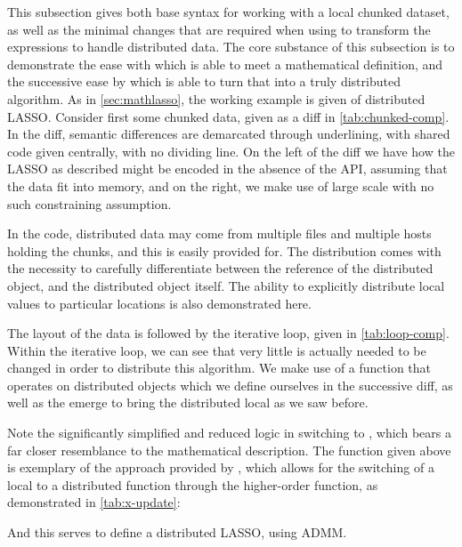 This subsection gives both base \R{} syntax for working with a local chunked dataset, as well as the minimal changes that are required when using \lsr{} to transform the expressions to handle distributed data.
The core substance of this subsection is to demonstrate the ease with which \R{} is able to meet a mathematical definition, and the successive ease by which \lsr{} is able to turn that into a truly distributed algorithm.
As in \cref{sec:mathlasso}, the working example is given of distributed LASSO.
Consider first some chunked data, given as a diff in \cref{tab:chunked-comp}.
In the diff, semantic differences are demarcated through underlining, with shared code given centrally, with no dividing line.
On the left of the diff we have how the LASSO as described might be encoded in the absence of the API, assuming that the data fit into memory, and on the right, we make use of large scale \R{} with no such constraining assumption.

In the \lsr{} code, distributed data may come from multiple files and multiple hosts holding the chunks, and this is easily provided for.
The distribution comes with the necessity to carefully differentiate between the reference of the distributed object, and the distributed object itself.
The ability to explicitly distribute local values to particular locations is also demonstrated here.


The layout of the data is followed by the iterative loop, given in \cref{tab:loop-comp}.
Within the iterative loop, we can see that very little is actually needed to be changed in order to distribute this algorithm.
We make use of a function that operates on distributed objects which we define ourselves in the successive diff, as well as the emerge to bring the distributed local as we saw before.


Note the significantly simplified and reduced logic in switching to \lsr{}, which bears a far closer resemblance to the mathematical description.
The  function given above is exemplary of the approach provided by \lsr{}, which allows for the switching of a local to a distributed function through the higher-order  function, as demonstrated in \cref{tab:x-update}:


And this serves to define a distributed LASSO, using ADMM.

